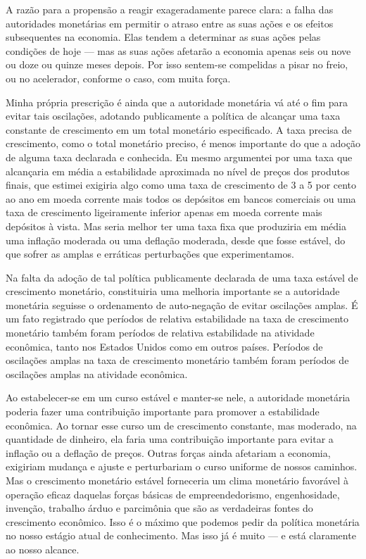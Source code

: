 \documentclass[12pt]{article}
\begin{document}
A razão para a propensão a reagir exageradamente parece clara: a falha das autoridades monetárias em permitir o atraso entre as suas ações e os efeitos subsequentes na economia. Elas tendem a determinar as suas ações pelas condições de hoje — mas as suas ações afetarão a economia apenas seis ou nove ou doze ou quinze meses depois. Por isso sentem-se compelidas a pisar no freio, ou no acelerador, conforme o caso, com muita força.

Minha própria prescrição é ainda que a autoridade monetária vá até o fim para evitar tais oscilações, adotando publicamente a política de alcançar uma taxa constante de crescimento em um total monetário especificado. A taxa precisa de crescimento, como o total monetário preciso, é menos importante do que a adoção de alguma taxa declarada e conhecida. Eu mesmo argumentei por uma taxa que alcançaria em média a estabilidade aproximada no nível de preços dos produtos finais, que estimei exigiria algo como uma taxa de crescimento de 3 a 5 por cento ao ano em moeda corrente mais todos os depósitos em bancos comerciais ou uma taxa de crescimento ligeiramente inferior apenas em moeda corrente mais depósitos à vista. Mas seria melhor ter uma taxa fixa que produziria em média uma inflação moderada ou uma deflação moderada, desde que fosse estável, do que sofrer as amplas e erráticas perturbações que experimentamos.

Na falta da adoção de tal política publicamente declarada de uma taxa estável de crescimento monetário, constituiria uma melhoria importante se a autoridade monetária seguisse o ordenamento de auto-negação de evitar oscilações amplas. É um fato registrado que períodos de relativa estabilidade na taxa de crescimento monetário também foram períodos de relativa estabilidade na atividade econômica, tanto nos Estados Unidos como em outros países. Períodos de oscilações amplas na taxa de crescimento monetário também foram períodos de oscilações amplas na atividade econômica.

Ao estabelecer-se em um curso estável e manter-se nele, a autoridade monetária poderia fazer uma contribuição importante para promover a estabilidade econômica. Ao tornar esse curso um de crescimento constante, mas moderado, na quantidade de dinheiro, ela faria uma contribuição importante para evitar a inflação ou a deflação de preços. Outras forças ainda afetariam a economia, exigiriam mudança e ajuste e perturbariam o curso uniforme de nossos caminhos. Mas o crescimento monetário estável forneceria um clima monetário favorável à operação eficaz daquelas forças básicas de empreendedorismo, engenhosidade, invenção, trabalho árduo e parcimônia que são as verdadeiras fontes do crescimento econômico. Isso é o máximo que podemos pedir da política monetária no nosso estágio atual de conhecimento. Mas isso já é muito — e está claramente ao nosso alcance.
\end{document}
